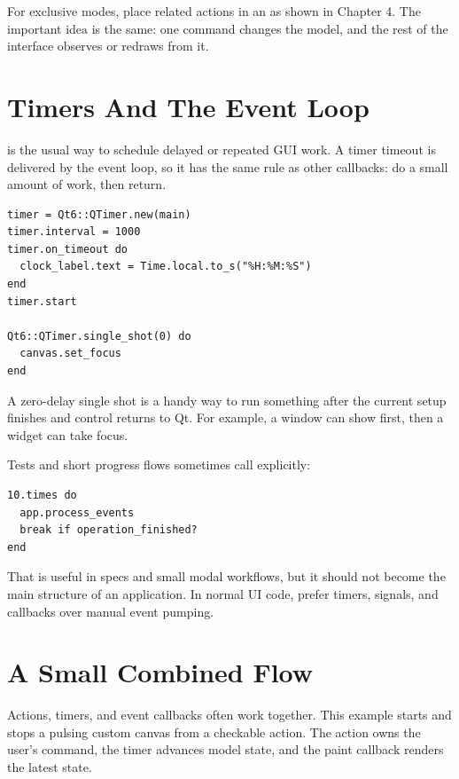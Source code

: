 For exclusive modes, place related actions in an  as shown in Chapter 4. The important idea is the same: one command changes the model, and the rest of the interface observes or redraws from it.

\section{Timers And The Event Loop}

 is the usual way to schedule delayed or repeated GUI work. A timer timeout is delivered by the event loop, so it has the same rule as other callbacks: do a small amount of work, then return.

\begin{lstlisting}[style=crystal]
timer = Qt6::QTimer.new(main)
timer.interval = 1000
timer.on_timeout do
  clock_label.text = Time.local.to_s("%H:%M:%S")
end
timer.start

Qt6::QTimer.single_shot(0) do
  canvas.set_focus
end
\end{lstlisting}

A zero-delay single shot is a handy way to run something after the current setup finishes and control returns to Qt. For example, a window can show first, then a widget can take focus.

Tests and short progress flows sometimes call  explicitly:

\begin{lstlisting}[style=crystal]
10.times do
  app.process_events
  break if operation_finished?
end
\end{lstlisting}

That is useful in specs and small modal workflows, but it should not become the main structure of an application. In normal UI code, prefer timers, signals, and callbacks over manual event pumping.

\section{A Small Combined Flow}

Actions, timers, and event callbacks often work together. This example starts and stops a pulsing custom canvas from a checkable action. The action owns the user's command, the timer advances model state, and the paint callback renders the latest state.

